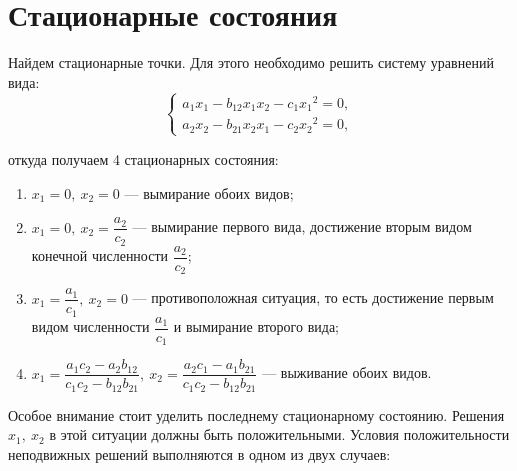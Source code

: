 \documentclass[12pt,a4paper]{article}
\begin{document}
    \section{Стационарные состояния}

    Найдем стационарные точки. Для этого необходимо решить систему уравнений вида: 
    \begin{equation}
        \label{seps}
        \begin{cases}
            a_1 x_1 - b_{12} x_1 x_2 - c_1 {x_1}\!^2 = 0,
            \\
            a_2 x_2 - b_{21} x_2 x_1 - c_2 {x_2}\!^2 = 0,
        \end{cases}
    \end{equation}
    \pagebreak
    
    \noindent откуда получаем 4 стационарных состояния:
    \begin{enumerate}
        \setlength\itemsep{0.5em}
        \item $ x_1 = 0,\ x_2 = 0 $ --- вымирание обоих видов;
        \item $ x_1 = 0,\ x_2 = \dfrac{a_2}{c_2} $ --- вымирание первого вида, достижение вторым видом конечной численности $ \dfrac{a_2}{c_2} $;
        \item $ x_1 = \dfrac{a_1}{c_1},\ x_2 = 0 $ --- противоположная ситуация, то есть достижение первым видом численности $ \dfrac{a_1}{c_1} $ и вымирание второго вида;
        \item $ x_1 = \dfrac{a_1 c_2 - a_2 b_{12}}{c_1 c_2 - b_{12} b_{21}},\ x_2 = \dfrac{a_2 c_1 - a_1 b_{21}}{c_1 c_2 - b_{12} b_{21}}$ --- выживание обоих видов.
    \end{enumerate} 

    \vspace{1em}Особое внимание стоит уделить последнему стационарному состоянию. Решения $ x_1,\ x_2 $ в этой ситуации должны быть положительными. Условия положительности неподвижных решений выполняются в одном из двух случаев: 
\end{document}
